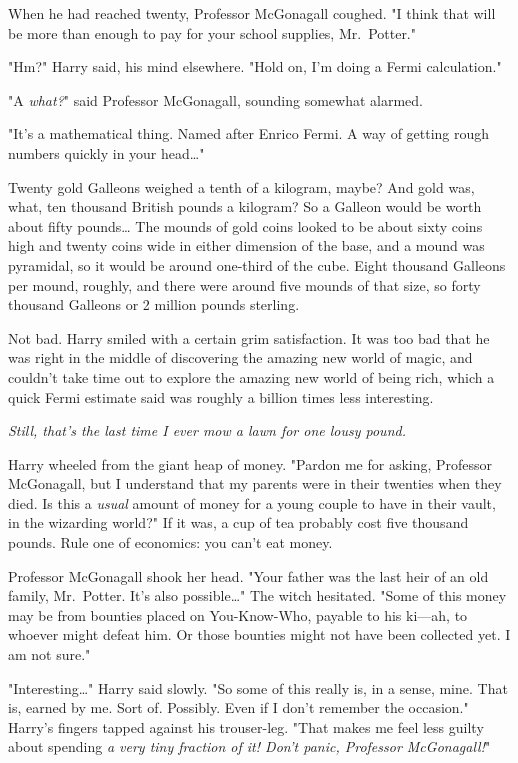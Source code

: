 When he had reached twenty, Professor McGonagall coughed. "I think that will be
more than enough to pay for your school supplies, Mr.~Potter."

"Hm?" Harry said, his mind elsewhere. "Hold on, I'm doing a Fermi calculation."

"A \emph{what?}" said Professor McGonagall, sounding somewhat alarmed.

"It's a mathematical thing. Named after Enrico Fermi. A way of getting rough
numbers quickly in your head{\ldots}"

Twenty gold Galleons weighed a tenth of a kilogram, maybe? And gold was, what,
ten thousand British pounds a kilogram? So a Galleon would be worth about fifty
pounds{\ldots} The mounds of gold coins looked to be about sixty coins high and
twenty coins wide in either dimension of the base, and a mound was pyramidal,
so it would be around one-third of the cube. Eight thousand Galleons per mound,
roughly, and there were around five mounds of that size, so forty thousand
Galleons or 2 million pounds sterling.

Not bad. Harry smiled with a certain grim satisfaction. It was too bad that he
was right in the middle of discovering the amazing new world of magic, and
couldn't take time out to explore the amazing new world of being rich, which a
quick Fermi estimate said was roughly a billion times less interesting.

\emph{Still, that's the last time I ever mow a lawn for one lousy pound.}

Harry wheeled from the giant heap of money. "Pardon me for asking, Professor
McGonagall, but I understand that my parents were in their twenties when they
died. Is this a \emph{usual} amount of money for a young couple to have in
their vault, in the wizarding world?" If it was, a cup of tea probably cost
five thousand pounds. Rule one of economics: you can't eat money.

Professor McGonagall shook her head. "Your father was the last heir of an old
family, Mr.~Potter. It's also possible{\ldots}" The witch hesitated. "Some of
this money may be from bounties placed on You-Know-Who, payable to his ki---ah,
to whoever might defeat him. Or those bounties might not have been collected
yet. I am not sure."

"Interesting{\ldots}" Harry said slowly. "So some of this really is, in a
sense, mine. That is, earned by me. Sort of. Possibly. Even if I don't remember
the occasion." Harry's fingers tapped against his trouser-leg. "That makes me
feel less guilty about spending \emph{a very tiny fraction of it! Don't panic,
Professor McGonagall!}"

